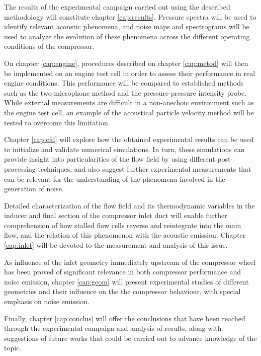 The results of the experimental campaign carried out using the described methodology will constitute chapter \ref{cap:results}. Pressure spectra will be used to identify relevant acoustic phenomena, and noise maps and spectrograms will be used to analyze the evolution of these phenomena across the different operating conditions of the compressor.

On chapter \ref{cap:engine}, procedures described on chapter \ref{cap:metod} will then be implemented on an engine test cell in order to assess their performance in real engine conditions. This performance will be compared to established methods such as the two-microphone method and the pressure-pressure intensity probe. While external measurements are difficult in a non-anechoic environment such as the engine test cell, an example of the acoustical particle velocity method will be tested to overcome this limitation.

Chapter \ref{cap:cfd} will explore how the obtained experimental results can be used to initialize and validate numerical simulations. In turn, these simulations can provide insight into particularities of the flow field by using different post-processing techniques, and also suggest further experimental measurements that can be relevant for the understanding of the phenomena involved in the generation of noise.

Detailed characterization of the flow field and its thermodynamic variables in the inducer and final section of the compressor inlet duct will enable further comprehension of how stalled flow cells reverse and reintegrate into the main flow, and the relation of this phenomenon with the acoustic emission. Chapter \ref{cap:inlet} will be devoted to the measurement and analysis of this issue.

As influence of the inlet geometry immediately upstream of the compressor wheel has been proved of significant relevance in both compressor performance and noise emission, chapter \ref{cap:geom} will present experimental studies of different geometries and their influence on the the compressor behaviour, with special emphasis on noise emission.

Finally, chapter \ref{cap:conclus} will offer the conclusions that have been reached through the experimental campaign and analysis of results, along with suggestions of future works that could be carried out to advance knowledge of the topic.
